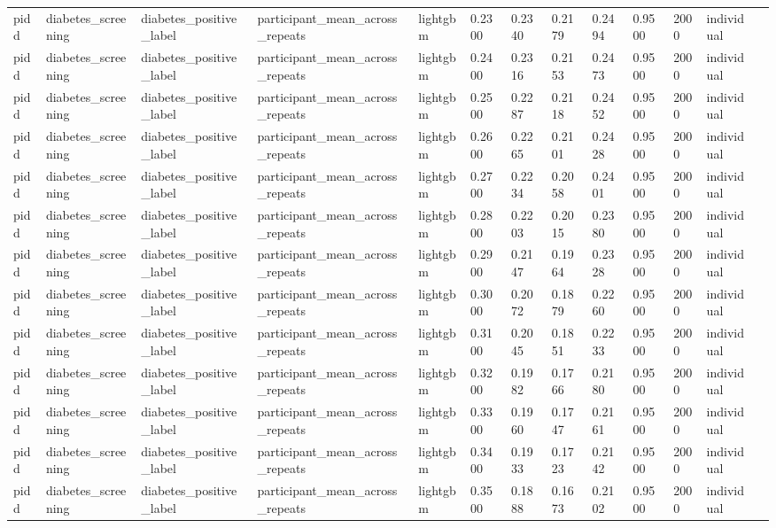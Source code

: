 \begin{tabular}{lllllllllllll}
pidd & diabetes\_screening & diabetes\_positive\_label & participant\_mean\_across\_repeats & lightgbm & 0.2300 & 0.2340 & 0.2179 & 0.2494 & 0.9500 & 2000 & individual &  \\
pidd & diabetes\_screening & diabetes\_positive\_label & participant\_mean\_across\_repeats & lightgbm & 0.2400 & 0.2316 & 0.2153 & 0.2473 & 0.9500 & 2000 & individual &  \\
pidd & diabetes\_screening & diabetes\_positive\_label & participant\_mean\_across\_repeats & lightgbm & 0.2500 & 0.2287 & 0.2118 & 0.2452 & 0.9500 & 2000 & individual &  \\
pidd & diabetes\_screening & diabetes\_positive\_label & participant\_mean\_across\_repeats & lightgbm & 0.2600 & 0.2265 & 0.2101 & 0.2428 & 0.9500 & 2000 & individual &  \\
pidd & diabetes\_screening & diabetes\_positive\_label & participant\_mean\_across\_repeats & lightgbm & 0.2700 & 0.2234 & 0.2058 & 0.2401 & 0.9500 & 2000 & individual &  \\
pidd & diabetes\_screening & diabetes\_positive\_label & participant\_mean\_across\_repeats & lightgbm & 0.2800 & 0.2203 & 0.2015 & 0.2380 & 0.9500 & 2000 & individual &  \\
pidd & diabetes\_screening & diabetes\_positive\_label & participant\_mean\_across\_repeats & lightgbm & 0.2900 & 0.2147 & 0.1964 & 0.2328 & 0.9500 & 2000 & individual &  \\
pidd & diabetes\_screening & diabetes\_positive\_label & participant\_mean\_across\_repeats & lightgbm & 0.3000 & 0.2072 & 0.1879 & 0.2260 & 0.9500 & 2000 & individual &  \\
pidd & diabetes\_screening & diabetes\_positive\_label & participant\_mean\_across\_repeats & lightgbm & 0.3100 & 0.2045 & 0.1851 & 0.2233 & 0.9500 & 2000 & individual &  \\
pidd & diabetes\_screening & diabetes\_positive\_label & participant\_mean\_across\_repeats & lightgbm & 0.3200 & 0.1982 & 0.1766 & 0.2180 & 0.9500 & 2000 & individual &  \\
pidd & diabetes\_screening & diabetes\_positive\_label & participant\_mean\_across\_repeats & lightgbm & 0.3300 & 0.1960 & 0.1747 & 0.2161 & 0.9500 & 2000 & individual &  \\
pidd & diabetes\_screening & diabetes\_positive\_label & participant\_mean\_across\_repeats & lightgbm & 0.3400 & 0.1933 & 0.1723 & 0.2142 & 0.9500 & 2000 & individual &  \\
pidd & diabetes\_screening & diabetes\_positive\_label & participant\_mean\_across\_repeats & lightgbm & 0.3500 & 0.1888 & 0.1673 & 0.2102 & 0.9500 & 2000 & individual &  \\

\end{tabular}
